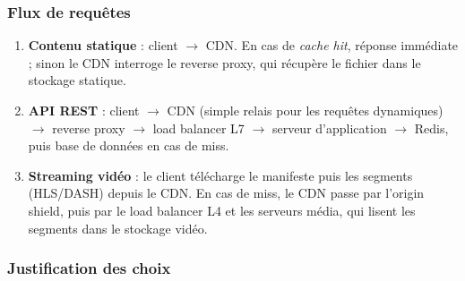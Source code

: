 \documentclass[12pt,a4paper]{article}
\begin{document}
\subsubsection*{Flux de requ\^etes}
\begin{enumerate}
  \item \textbf{Contenu statique} : client $\rightarrow$ CDN. En cas de \textit{cache hit}, r\'eponse imm\'ediate ; sinon le CDN interroge le reverse proxy, qui r\'ecup\`ere le fichier dans le stockage statique.
  \item \textbf{API REST} : client $\rightarrow$ CDN (simple relais pour les requ\^etes dynamiques) $\rightarrow$ reverse proxy $\rightarrow$ load balancer L7 $\rightarrow$ serveur d'application $\rightarrow$ Redis, puis base de donn\'ees en cas de miss.
  \item \textbf{Streaming vid\'eo} : le client t\'el\'echarge le manifeste puis les segments (HLS/DASH) depuis le CDN. En cas de miss, le CDN passe par l'origin shield, puis par le load balancer L4 et les serveurs m\'edia, qui lisent les segments dans le stockage vid\'eo.
\end{enumerate}

\subsubsection*{Justification des choix}
\end{document}
